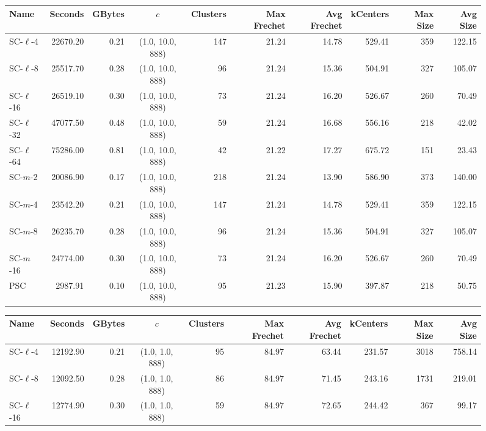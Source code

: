 \documentclass[11pt]{article}
\begin{document}
\begin{figure} \begin{center}
    \begin{minipage}{\textwidth}
    {
    \begin{tabular}{@{}lrrcrrrrrr@{}}
        \toprule
        Name & Seconds & GBytes & $c$ & Clusters & Max Frechet & Avg Frechet & kCenters & Max Size & Avg Size\\
        \midrule
        SC-$\ell$-4 & 22670.20 & 0.21 & (1.0, 10.0, 888) & 147 & 21.24 & 14.78 & 529.41 & 359 & 122.15\\
        SC-$\ell$-8 & 25517.70 & 0.28 & (1.0, 10.0, 888) & 96 & 21.24 & 15.36 & 504.91 & 327 & 105.07\\
        SC-$\ell$-16 & 26519.10 & 0.30 & (1.0, 10.0, 888) & 73 & 21.24 & 16.20 & 526.67 & 260 & 70.49\\
        SC-$\ell$-32 & 47077.50 & 0.48 & (1.0, 10.0, 888) & 59 & 21.24 & 16.68 & 556.16 & 218 & 42.02\\
        SC-$\ell$-64 & 75286.00 & 0.81 & (1.0, 10.0, 888) & 42 & 21.22 & 17.27 & 675.72 & 151 & 23.43\\
        SC-$m$-2 & 20086.90 & 0.17 & (1.0, 10.0, 888) & 218 & 21.24 & 13.90 & 586.90 & 373 & 140.00\\
        SC-$m$-4 & 23542.20 & 0.21 & (1.0, 10.0, 888) & 147 & 21.24 & 14.78 & 529.41 & 359 & 122.15\\
        SC-$m$-8 & 26235.70 & 0.28 & (1.0, 10.0, 888) & 96 & 21.24 & 15.36 & 504.91 & 327 & 105.07\\
        SC-$m$-16 & 24774.00 & 0.30 & (1.0, 10.0, 888) & 73 & 21.24 & 16.20 & 526.67 & 260 & 70.49\\
        PSC & 2987.91 & 0.10 & (1.0, 10.0, 888) & 95 & 21.23 & 15.90 & 397.87 & 218 & 50.75 \\
        \bottomrule
    \end{tabular}}
    {
    \begin{tabular}{@{}lrrcrrrrrr@{}}
        \toprule
        Name & Seconds & GBytes & $c$ & Clusters & Max Frechet & Avg Frechet & kCenters & Max Size & Avg Size\\
        \midrule
        SC-$\ell$-4 & 12192.90 & 0.21 & (1.0, 1.0, 888) & 95 & 84.97 & 63.44 & 231.57 & 3018 & 758.14\\
        SC-$\ell$-8 & 12092.50 & 0.28 & (1.0, 1.0, 888) & 86 & 84.97 & 71.45 & 243.16 & 1731 & 219.01\\
        SC-$\ell$-16 & 12774.90 & 0.30 & (1.0, 1.0, 888) & 59 & 84.97 & 72.65 & 244.42 & 367 & 99.17\\

\end{tabular}}
\end{minipage}
\end{center}
\end{figure}
\end{document}
